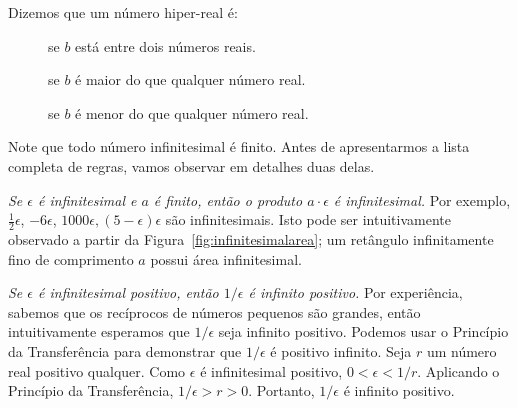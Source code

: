 
\begin{defin}
Dizemos que um número hiper-real é:
\begin{description}
\item[] se $b$ está entre dois números reais.
\item[] se $b$ é maior do que qualquer número real.
\item[] se $b$ é menor do que qualquer número real.
\end{description}
\end{defin}

Note que todo número infinitesimal é finito. Antes de apresentarmos a
lista completa de regras, vamos observar em detalhes duas delas.

\emph{Se $\epsilon$ é infinitesimal e $a$ é finito, então o produto
$a \cdot \epsilon$ é infinitesimal.} Por exemplo, $\frac{1}{2}\epsilon$,
$-6\epsilon$, $1000\epsilon, (5-\epsilon)\epsilon$ são infinitesimais.
Isto pode ser intuitivamente observado a partir da
Figura~\ref{fig:infinitesimalarea}; um retângulo infinitamente fino de
comprimento $a$ possui área infinitesimal.


\emph{Se $\epsilon$ é infinitesimal positivo, então $1/\epsilon$ é infinito
positivo.} Por experiência, sabemos que os recíprocos de números pequenos
são grandes, então intuitivamente esperamos que $1/\epsilon$ seja infinito
positivo. Podemos usar o Princípio da Transferência para demonstrar que
$1/\epsilon$ é positivo infinito. Seja $r$ um número real positivo qualquer.
Como $\epsilon$ é infinitesimal positivo, $0 < \epsilon < 1/r$. Aplicando
o Princípio da Transferência, $1/\epsilon > r > 0$. Portanto, $1/\epsilon$
é infinito positivo.


